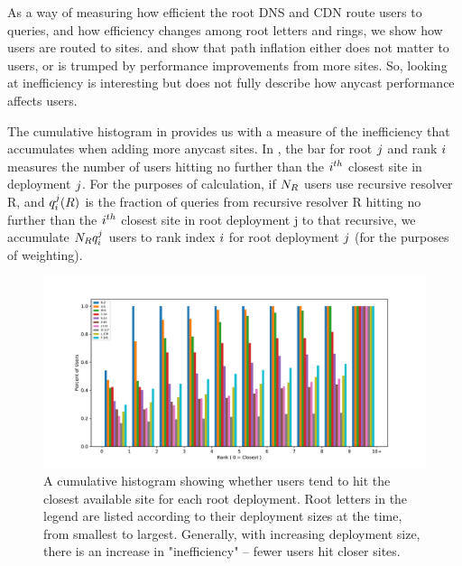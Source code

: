 \documentclass[sigconf,letterpaper,nonacm,10pt,anonymous]{acmart}
\begin{document}
\label{ap:distance_ranks}

As a way of measuring how efficient the root DNS and CDN route users to
queries, and how efficiency changes among root letters and rings, we
show how users are routed to sites.  and
 show that path inflation either does not matter
to users, or is trumped by performance improvements from more sites. So,
looking at inefficiency is interesting but does not fully describe how
anycast performance affects users.

The cumulative histogram in  provides
us with a measure of the inefficiency that accumulates when adding more
anycast sites. In , the bar for root
\(\mathnormal{j}\) and rank \(\mathnormal{i}\) measures the number of
users hitting no further than the \(\mathnormal{i}^{th}\) closest site
in deployment \(\mathnormal{j}\). For the purposes of calculation, if
\(\mathnormal{N_{R}}\) users use recursive resolver R, and
\(\mathnormal{q^j_i(R)}\) is the fraction of queries from recursive
resolver R hitting no further than the \(\mathnormal{i}^{th}\) closest
site in root deployment j to that recursive, we accumulate
\(\mathnormal{N_{R} q^j_i}\) users to rank index \(\mathnormal{i}\) for
root deployment \(\mathnormal{j}\) (\ie for the purposes of weighting).

\begin{figure}
    \centering
    \includegraphics[width=\linewidth]{figures/distance_rank_root_dns.pdf}
    \caption{A cumulative histogram showing whether users tend to hit the closest available site for each root deployment. Root letters in the legend are listed according to their deployment sizes at the time, from smallest to largest. Generally, with increasing deployment size, there is an increase in "inefficiency" -- fewer users hit closer sites. }
    \label{fig:distance_rank_root_dns}
\end{figure}
\end{document}
